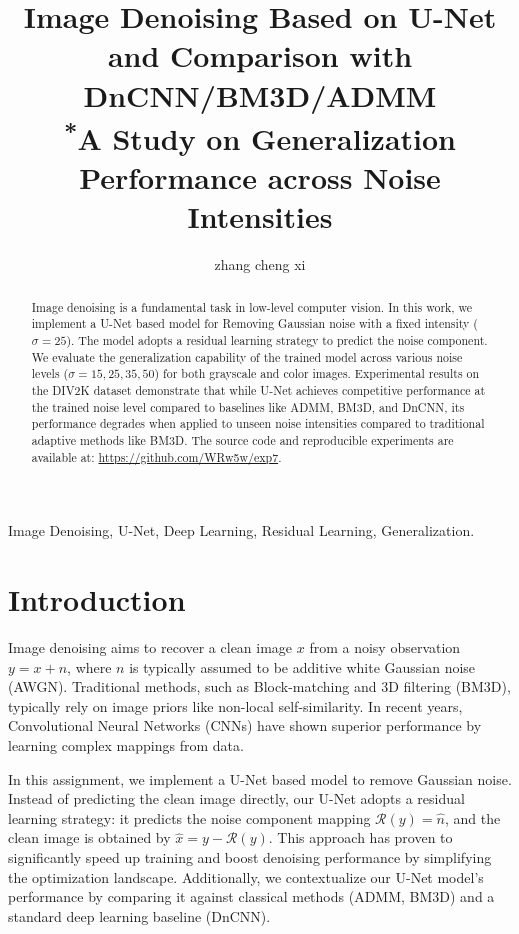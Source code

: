 \documentclass[conference]{IEEEtran}
\begin{document}
\title{Image Denoising Based on U-Net and Comparison with DnCNN/BM3D/ADMM\\
{\footnotesize \textsuperscript{*}A Study on Generalization Performance across Noise Intensities }
}


\author{zhang cheng xi}

\maketitle

\begin{abstract}
Image denoising is a fundamental task in low-level computer vision. In this work, we implement a U-Net based model for Removing Gaussian noise with a fixed intensity ($\sigma=25$). The model adopts a residual learning strategy to predict the noise component. We evaluate the generalization capability of the trained model across various noise levels ($\sigma=15, 25, 35, 50$) for both grayscale and color images. Experimental results on the DIV2K dataset demonstrate that while U-Net achieves competitive performance at the trained noise level compared to baselines like ADMM, BM3D, and DnCNN, its performance degrades when applied to unseen noise intensities compared to traditional adaptive methods like BM3D.
The source code and reproducible experiments are available at: \url{https://github.com/WRw5w/exp7}.
\end{abstract}

\begin{IEEEkeywords}
Image Denoising, U-Net, Deep Learning, Residual Learning, Generalization.
\end{IEEEkeywords}

\section{Introduction}
Image denoising aims to recover a clean image $x$ from a noisy observation $y = x + n$, where $n$ is typically assumed to be additive white Gaussian noise (AWGN). Traditional methods, such as Block-matching and 3D filtering (BM3D), typically rely on image priors like non-local self-similarity. In recent years, Convolutional Neural Networks (CNNs) have shown superior performance by learning complex mappings from data.

In this assignment, we implement a U-Net based model to remove Gaussian noise. Instead of predicting the clean image directly, our U-Net adopts a residual learning strategy: it predicts the noise component mapping $\mathcal{R}(y) = \hat{n}$, and the clean image is obtained by $\hat{x} = y - \mathcal{R}(y)$. This approach has proven to significantly speed up training and boost denoising performance by simplifying the optimization landscape. Additionally, we contextualize our U-Net model's performance by comparing it against classical methods (ADMM, BM3D) and a standard deep learning baseline (DnCNN).
\end{document}
